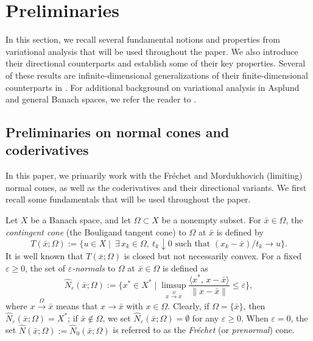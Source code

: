 \documentclass[12pt,twoside,reqno]{amsart}
\theoremstyle{definition}
\numberwithin{equation}{section}
\begin{document}
\section{Preliminaries}
In this section, we recall several fundamental notions and properties from variational analysis that will be used throughout the paper. 
We also introduce their directional counterparts and establish some of their key properties. 
Several of these results are infinite-dimensional generalizations of their finite-dimensional counterparts in \cite{gfrerer2013directional,Bai2023Directional}.  
For additional background on variational analysis in Asplund and general Banach spaces, we refer the reader to \cite{Mordukhovich2006variational}.  

\subsection{Preliminaries on normal cones and coderivatives}\label{subsec for preliminary on variational analysis}

In this paper, we primarily work with the Fr\'echet and Mordukhovich (limiting) normal cones, as well as the coderivatives and their directional variants. 
We first recall some fundamentals that will be used throughout the paper.

Let $X$ be a Banach space, and let $\Omega\subset X$ be a nonempty subset. For $\bar x\in\Omega$, the \emph{contingent cone} (the Bouligand tangent cone) to $\Omega$ at $\bar x$ is defined by
\begin{equation*}
    T(\bar x;\Omega)
    :=\{u\in X \mid ~ \exists\, x_k\in \Omega,~ t_k\downarrow 0 \text{ such that } (x_k-\bar x)/t_k \to u \}.
\end{equation*}
It is well known that $T(\bar x;\Omega)$ is closed but not necessarily convex. For a fixed $\varepsilon \ge 0$, the set of \emph{$\varepsilon$-normals} to $\Omega$ at $\bar x \in \Omega$ is defined as
\begin{equation*}
    \hat{N}_{\varepsilon}(\bar x;\Omega)
    := \big\{x^* \in X^* \mid 
    \limsup_{x \xrightarrow{\Omega} \bar x}
    \frac{\langle x^*,\, x - \bar x \rangle}{\|x - \bar x\|}
    \le \varepsilon \big\},
\end{equation*}
where $x \xrightarrow{\Omega} \bar x$ means that $x \to \bar x$ with $x \in \Omega$. 
Clearly, if $\Omega = \{\bar x\}$, then $\hat{N}_{\varepsilon}(\bar x;\Omega) = X^*$; 
if $\bar x \notin \Omega$, we set $\hat{N}_{\varepsilon}(\bar x;\Omega) = \emptyset$ for any $\varepsilon \ge 0$. 
When $\varepsilon = 0$, the set $\hat{N}(\bar x;\Omega) := \hat{N}_0(\bar x;\Omega)$ is referred to as the \emph{Fr\'echet} (or \emph{prenormal}) cone.
\end{document}
